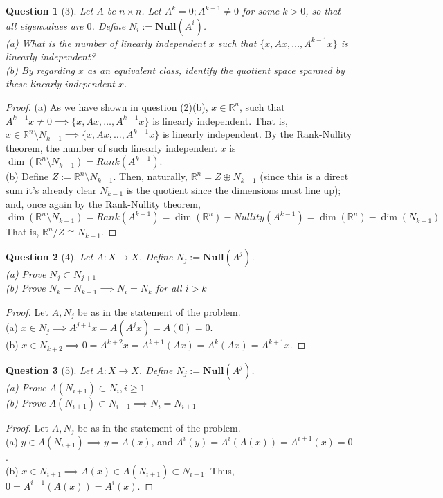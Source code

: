 \documentclass[11pt]{article}
\theoremstyle{quest}
\newtheorem*{question}{Question}
\begin{document}
\begin{question}[3]
Let $A$ be $n \times n$. Let $A^k = 0; A^{k-1} \ne 0$ for some $k > 0$, so that all eigenvalues are $0$. Define $N_i := \mathbf{Null}(A^i)$.
\\(a) What is the number of linearly independent $x$ such that $\{x, Ax, \ldots, A^{k-1}x\}$ is linearly independent?
\\(b) By regarding $x$ as an equivalent class, identify the quotient space spanned by these linearly independent $x$. 
\end{question}
\begin{proof}
(a) As we have shown in question (2)(b), $x \in \mathbb{R}^n$, such that $A^{k-1} x \ne 0 \implies \{x, Ax, \ldots, A^{k-1}x\}$ is linearly independent. That is, $x \in \mathbb{R}^n \setminus N_{k-1} \implies \{x, Ax, \ldots, A^{k-1}x\}$ is linearly independent. By the Rank-Nullity theorem, the number of such linearly independent $x$ is $\dim(\mathbb{R}^n \setminus N_{k-1}) = Rank(A^{k-1})$.
\\(b) Define $Z := \mathbb{R}^n \setminus N_{k-1}$. Then, naturally, $\mathbb{R}^n = Z \oplus N_{k-1}$ (since this is a direct sum it's already clear $N_{k-1}$ is the quotient since the dimensions must line up); and, once again by the Rank-Nullity theorem, $$\dim(\mathbb{R}^n \setminus N_{k-1}) = Rank(A^{k-1}) = \dim(\mathbb{R}^n) - Nullity(A^{k-1}) = \dim(\mathbb{R}^n) - \dim(N_{k-1})$$
That is, $\mathbb{R}^n / Z \cong N_{k-1}$.
\end{proof}
\begin{question}[4]
Let $A: X \rightarrow X$. Define $N_j := \mathbf{Null}(A^j)$.
\\(a) Prove $N_j \subset N_{j+1}$
\\(b) Prove $N_k = N_{k+1} \implies N_i = N_k$ for all $i > k$
\end{question}
\begin{proof}
  Let $A, N_j$ be as in the statement of the problem.
  \\(a) $x \in N_j \implies A^{j+1}x = A(A^j x) = A(0) = 0$.
  \\(b) $x \in N_{k+2} \implies 0 = A^{k+2}x = A^{k+1}(Ax) = A^k(Ax) = A^{k+1}x$.
\end{proof}
\begin{question}[5]
Let $A: X \rightarrow X$. Define $N_j := \mathbf{Null}(A^j)$.
\\(a) Prove $A(N_{i+1}) \subset N_i, i \ge 1$
\\(b) Prove $A(N_{i+1}) \subset N_{i-1} \implies N_i = N_{i+1}$
\end{question}
\begin{proof}
Let $A, N_j$ be as in the statement of the problem.
  \\(a) $y \in A(N_{i+1}) \implies y = A(x)$, and $A^i(y) = A^i(A(x)) = A^{i+1}(x) = 0$.
  \\(b) $x \in N_{i+1} \implies A(x) \in A(N_{i+1}) \subset N_{i-1}$. Thus, $0 = A^{i-1}(A(x)) = A^i(x)$.
\end{proof}
\end{document}

